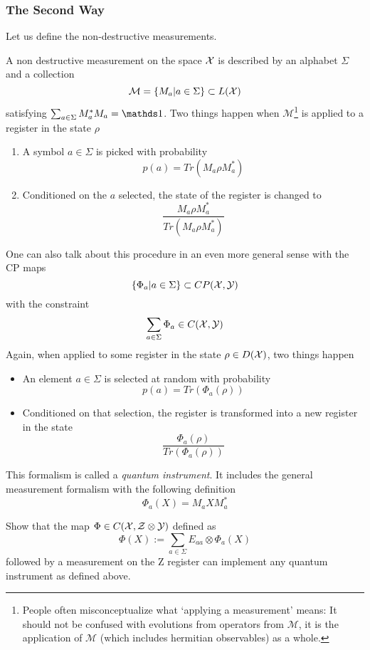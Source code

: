 \subsubsection{The Second Way}
Let us define the non-destructive measurements.
\begin{definition}
A non destructive measurement on the space $\mathcal{X}$ is described by an alphabet $\Sigma$ and a collection 
\[\mathcal{M} = \{M_a|a\in\Sigma\} \subset L(\mathcal{X})\]
satisfying $\sum_{a\in\Sigma}M_a^*M_a = \iden$. Two things happen when $\mathcal{M}$\footnote{People often misconceptualize what `applying a measurement' means: It should not be confused with evolutions from operators from $\mathcal{M}$, it is the application of $\mathcal{M}$ (which includes hermitian observables) as a whole.} is applied to a register in the state $\rho$
\begin{enumerate}
    \item A symbol $a\in\Sigma$ is picked with probability
    \[p(a) = Tr(M_a\rho M_a^*)\]
    \item Conditioned on the $a$ selected, the state of the register is changed to
    \[\frac{M_a\rho M_a^*}{Tr(M_a\rho M_a^*)}\]
\end{enumerate}
\end{definition}
One can also talk about this procedure in an even more general sense with the CP maps
\[\{\Phi_a|a\in\Sigma\} \subset CP(\mathcal{X},\mathcal{Y})\]
with the constraint
\[\sum_{a\in\Sigma}\Phi_a \in C(\mathcal{X},\mathcal{Y})\]
Again, when applied to some register in the state $\rho\in D(\mathcal{X})$, two things happen
\begin{itemize}
    \item An element $a\in\Sigma$ is selected at random with probability
    \[p(a) = Tr(\Phi_a(\rho))\]
    \item Conditioned on that selection, the register is transformed into a new register in the state
    \[\frac{\Phi_a(\rho)}{Tr(\Phi_a(\rho))}\]
\end{itemize}
This formalism is called a \textit{quantum instrument}. It includes the general measurement formalism with the following definition
\[\Phi_a(X) = M_aXM_a^*\]
\begin{exercise}
Show that the map $\Phi \in C(\mathcal{X},\mathcal{Z}\otimes\mathcal{Y})$ defined as
\[\Phi(X) := \sum_{a\in\Sigma}E_{aa}\otimes\Phi_a(X)\]
followed by a measurement on the Z register can implement any quantum instrument as defined above.
\end{exercise}
